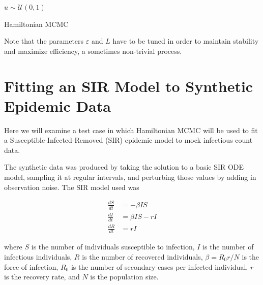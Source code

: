\documentclass[12pt]{article}
\begin{document}
\begin{algorithm}[H]
{            \BlankLine

            $u \sim \mathcal{U}(0,1)$

            \BlankLine

        }

        \BlankLine


        \BlankLine

        \caption{Hamiltonian MCMC}\label{hmcmc}

    \end{algorithm}

    Note that the parameters $\varepsilon$ and $L$ have to be tuned in order to maintain stability and maximize efficiency, a sometimes non-trivial process.
    
\section{Fitting an SIR Model to Synthetic Epidemic Data}

    Here we will examine a test case in which Hamiltonian MCMC will be used to fit a Susceptible-Infected-Removed (SIR) epidemic model to mock infectious count data.

    The synthetic data was produced by taking the solution to a basic SIR ODE model, sampling it at regular intervals, and perturbing those values by adding in observation noise. The SIR model used was

    \begin{equation}
        \begin{array}{rl}
            \frac{dS}{dt} & = - \beta I S \\
            \frac{dI}{dt} & = \beta I S - rI  \\
            \frac{dR}{dt} & = rI
        \end{array}
    \end{equation}

    where $S$ is the number of individuals susceptible to infection, $I$ is the number of infectious individuals, $R$ is the number of recovered individuals, $\beta = R_0 r / N$ is the force of infection, $R_0$ is the number of secondary cases per infected individual, $r$ is the recovery rate, and $N$ is the population size.
\end{document}
